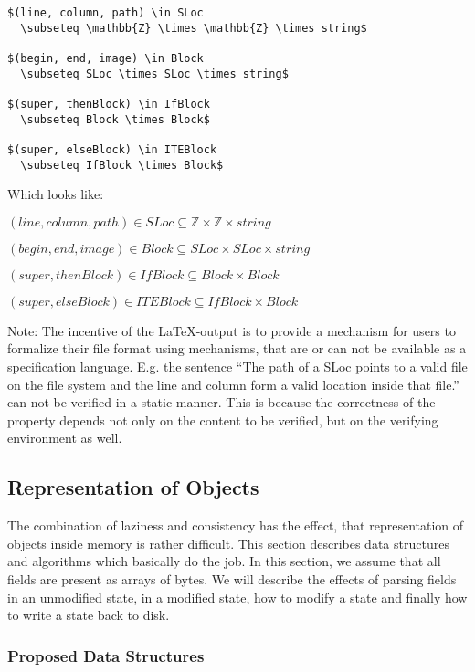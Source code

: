 \begin{lstlisting}[label=latexExample,caption=LaTeX Examples,language={[LaTeX]TeX}]
$(line, column, path) \in SLoc
  \subseteq \mathbb{Z} \times \mathbb{Z} \times string$

$(begin, end, image) \in Block
  \subseteq SLoc \times SLoc \times string$

$(super, thenBlock) \in IfBlock
  \subseteq Block \times Block$

$(super, elseBlock) \in ITEBlock
  \subseteq IfBlock \times Block$
\end{lstlisting}
Which looks like:

$(line, column, path) \in SLoc \subseteq \mathbb{Z} \times \mathbb{Z} \times string$

$(begin, end, image) \in Block \subseteq SLoc \times SLoc \times string$

$(super, thenBlock) \in IfBlock \subseteq Block \times Block$

$(super, elseBlock) \in ITEBlock \subseteq IfBlock \times Block$

Note: The incentive of the \LaTeX-output is to provide a mechanism for users to formalize their file format using mechanisms, that are or can not be available as a specification language. E.g. the sentence ``The path of a SLoc points to a valid file on the file system and the line and column form a valid location inside that file.'' can not be verified in a static manner. This is because the correctness of the property depends not only on the content to be verified, but on the verifying environment as well.


\subsection{Representation of Objects}

The combination of laziness and consistency has the effect, that representation of objects inside memory is rather difficult. This section describes data structures and algorithms which basically do the job. In this section, we assume that all fields are present as arrays of bytes. We will describe the effects of parsing fields in an unmodified state, in a modified state, how to modify a state and finally how to write a state back to disk.

\subsubsection{Proposed Data Structures}

